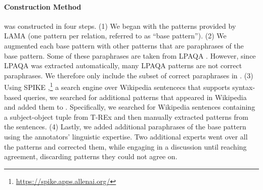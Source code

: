 
\paragraph{Construction Method}
\resource{} was constructed in four steps. (1) We began with
the patterns provided by LAMA \cite{lama} (one pattern per
relation, referred to as ``base pattern''). (2) We augmented
each base pattern with other patterns that are paraphrases of
the base pattern. Some of these paraphrases are taken from
LPAQA \cite{alpaqa}. However, since LPAQA was
extracted automatically, many LPAQA patterns are not
correct paraphrases.
We therefore only include the subset of correct paraphrases in \resource{}.
(3) Using SPIKE
\cite{spike},\footnote{\url{https://spike.apps.allenai.org/}}
a search engine over Wikipedia sentencecs that supports
syntax-based queries, we searched for additional patterns
that appeared in Wikipedia and added them to 
\resource{}. Specifically, we searched for Wikipedia sentences
containing a  subject-object
tuple from T-REx and then manually extracted 
patterns from the  sentences. (4) Lastly, we added
additional paraphrases of the base pattern
using the annotators' linguistic expertise. Two additional
experts went over all the patterns and corrected them, while
engaging in a discussion until reaching  agreement,
discarding patterns they could not agree on.




